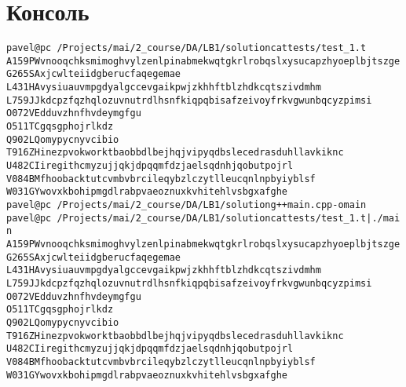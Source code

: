 \section{Консоль}
\begin{alltt}
 pavel@pc ~/Projects/mai/2_course/DA/LB1/solution cat tests/test_1.t 
A 159 PW	vnooqchksmimoghvylzenlpinabmekwqtgkrlrobqslxysucapzhyoeplbjtszge
G 265 SA	xjcwlteiidgberucfaqegemae
L 431 HA	vysiuauvmpgdyalgccevgaikpwjzkhhftblzhdkcqtszivdmhm
L 759 JJ	kdcpzfqzhqlozuvnutrdlhsnfkiqpqbisafzeivoyfrkvgwunbqcyzpimsi
O 072 VE	dduvzhnfhvdeymgfgu
O 511 TC	gqsgphojrlkdz
Q 902 LQ	omypycnyvcibio
T 916 ZH	inezpvokworktbaobbdlbejhqjvipyqdbslecedrasduhllavkiknc
U 482 CI	iregithcmyzujjqkjdpqqmfdzjaelsqdnhjqobutpojrl
V 084 BM	fhoobacktutcvmbvbrcileqybzlczytlleucqnlnpbyiyblsf
W 031 GY	wovxkbohipmgdlrabpvaeoznuxkvhitehlvsbgxafghe
 pavel@pc ~/Projects/mai/2_course/DA/LB1/solution  g++ main.cpp -o main
 pavel@pc ~/Projects/mai/2_course/DA/LB1/solution  cat tests/test_1.t | ./main 
A 159 PW	vnooqchksmimoghvylzenlpinabmekwqtgkrlrobqslxysucapzhyoeplbjtszge
G 265 SA	xjcwlteiidgberucfaqegemae
L 431 HA	vysiuauvmpgdyalgccevgaikpwjzkhhftblzhdkcqtszivdmhm
L 759 JJ	kdcpzfqzhqlozuvnutrdlhsnfkiqpqbisafzeivoyfrkvgwunbqcyzpimsi
O 072 VE	dduvzhnfhvdeymgfgu
O 511 TC	gqsgphojrlkdz
Q 902 LQ	omypycnyvcibio
T 916 ZH	inezpvokworktbaobbdlbejhqjvipyqdbslecedrasduhllavkiknc
U 482 CI	iregithcmyzujjqkjdpqqmfdzjaelsqdnhjqobutpojrl
V 084 BM	fhoobacktutcvmbvbrcileqybzlczytlleucqnlnpbyiyblsf
W 031 GY	wovxkbohipmgdlrabpvaeoznuxkvhitehlvsbgxafghe
\end{alltt}
\pagebreak

